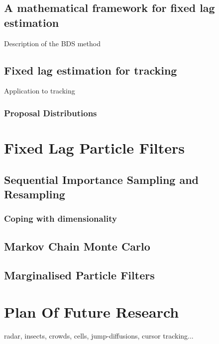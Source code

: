 \documentclass{RJWThesis}
\begin{document}
\section{A mathematical framework for fixed lag estimation}
Description of the BDS method \cite{Doucet2006}
\section{Fixed lag estimation for tracking}
Application to tracking
\subsection{Proposal Distributions}


\chapter{Fixed Lag Particle Filters}
\section{Sequential Importance Sampling and Resampling}
\subsection{Coping with dimensionality}
\section{Markov Chain Monte Carlo}
\section{Marginalised Particle Filters}

\chapter{Plan Of Future Research}
radar, insects, crowds, cells, jump-diffusions, cursor tracking...



\end{document}
